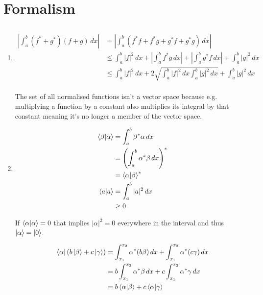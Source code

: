 \documentclass{article}
\begin{document}
\section{Formalism}

\subsection{}

\begin{enumerate}
  \item

        \begin{align*}
          \left| \int_a^b (f^* + g^*) (f + g) \,d x \right| & = \left| \int_a^b (f^* f + f^* g + g^* f + g^* g) \,d x \right|                                                             \\
                                                            & \le \int_a^b |f|^2 \,d x + \left| \int_a^b f^* g \,d x \right| + \left| \int_a^b g^* f \,d x \right| + \int_a^b |g|^2 \,d x \\
                                                            & \le \int_a^b |f|^2 \,d x + 2 \sqrt{\int_a^b |f|^2 \,d x \int_a^b |g|^2 \,d x} + \int_a^b |g|^2 \,d x                        \\
        \end{align*}

        The set of all normalised functions isn't a vector space because e.g. multiplying a function by a constant also multiplies its integral by that constant meaning it's no longer a member of the vector space.

  \item

        \begin{align*}
          \braket{\beta | \alpha} & = \int_a^b \beta^* \alpha \,d x                  \\
                                  & = \left( \int_a^b \alpha^* \beta \,d x \right)^* \\
                                  & = \braket{\alpha | \beta}^*                      \\
          \braket{a | a}          & = \int_a^b |a|^2 \,d x                           \\
                                  & \ge 0
        \end{align*}

        If $\braket{\alpha | \alpha} = 0$ that implies $|\alpha|^2 = 0$ everywhere in the interval and thus $\ket{\alpha} = \ket{0}$.

        \begin{align*}
          \bra{\alpha} (b \ket{\beta} + c \ket{\gamma}) & = \int_{x_1}^{x_2} \alpha^* (b \beta) \,d x + \int_{x_1}^{x_2} \alpha^* (c \gamma) \,d x \\
                                                        & = b \int_{x_1}^{x_2} \alpha^* \beta \,d x + c \int_{x_1}^{x_2} \alpha^* \gamma \,d x     \\
                                                        & = b \braket{\alpha | \beta} + c \braket{\alpha | \gamma}
        \end{align*}
\end{enumerate}
\end{document}
